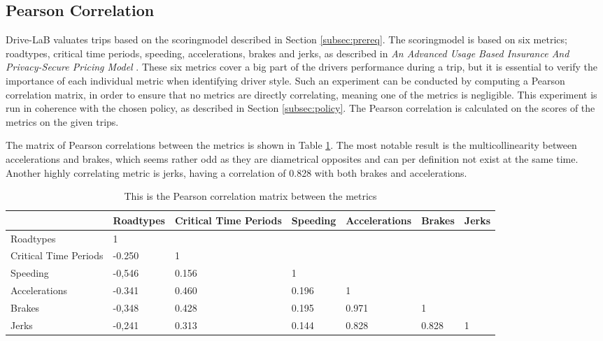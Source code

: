 \subsection{Pearson Correlation}\label{subsec:pearsoncorrelation}

Drive-LaB valuates trips based on the scoringmodel described in Section \ref{subsec:prereq}. The scoringmodel is based on six metrics; roadtypes, critical time periods, speeding, accelerations, brakes and jerks, as described in \textit{An Advanced Usage Based Insurance And Privacy-Secure Pricing Model} \citep{sw9_report}. These six metrics cover a big part of the drivers performance during a trip, but it is essential to verify the importance of each individual metric when identifying driver style. Such an experiment can be conducted by computing a Pearson correlation matrix, in order to ensure that no metrics are directly correlating, meaning one of the metrics is negligible. This experiment is run in coherence with the chosen policy, as described in Section \ref{subsec:policy}. The Pearson correlation is calculated on the scores of the metrics on the given trips.

The matrix of Pearson correlations between the metrics is shown in Table \ref{tab:pearsonmatrix}. The most notable result is the multicollinearity between accelerations and brakes, which seems rather odd as they are diametrical opposites and can per definition not exist at the same time. Another highly correlating metric is jerks, having a correlation of 0.828 with both brakes and accelerations. 

\begin{table}[tb]
\centering
\caption{This is the Pearson correlation matrix between the metrics}
\label{tab:pearsonmatrix}
\begin{tabular}{|l|llllll|}
\hline
\rowcolor{tablegreen}
                      & \textbf{Roadtypes} & \textbf{Critical Time Periods} & \textbf{Speeding} & \textbf{Accelerations} & \textbf{Brakes} & \textbf{Jerks} \\\hline
Roadtypes             & 1 &  &  &  &  &  \\
Critical Time Periods & -0.250    & 1  &  &  &  &  \\
Speeding              & -0,546    & 0.156                 & 1  &  &  &  \\
Accelerations         & -0.341    & 0.460                 & 0.196    & 1  &  &   \\
Brakes                & -0,348    & 0.428                 & 0.195    & 0.971         & 1 &   \\
Jerks                 & -0,241    & 0.313                 & 0.144    & 0.828         & 0.828  & 1 \\\hline  
\end{tabular}
\end{table}

